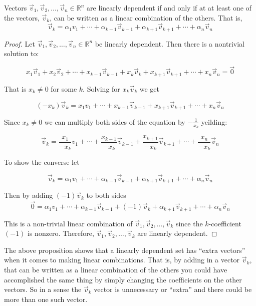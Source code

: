 \begin{proposition} Vectors $\vec{v}_1, \vec{v}_2, \ldots, \vec{v}_n \in \mathbb{R}^n$ are linearly dependent if and only if at at least one of the vectors, $\vec{v}_k$, can be written as a linear combination of the others. That is,
$$
\vec{v}_k=\alpha_1 v_1+ \cdots+ \alpha_{k-1}\vec{v}_{k-1}+ \alpha_{k+1}\vec{v}_{k+1}+\cdots+ \alpha_n \vec{v}_n
$$
\end{proposition}
\begin{proof}
Let $\vec{v}_1, \vec{v}_2, \ldots, \vec{v}_n \in \mathbb{R}^n$ be linearly dependent. Then there is a nontrivial solution to:

$$x_1\vec{v}_1+x_2\vec{v}_2+\cdots +x_{k-1}\vec{v}_{k-1}+ x_k\vec{v}_k+x_{k+1}\vec{v}_{k+1}+ \cdots + x_n \vec{v}_n=\vec{0}$$

That is $x_k \neq 0$ for some $k$. Solving for $x_k\vec{v}_k$ we get

$$
(-x_k)\vec{v}_k=x_1 v_1+ \cdots + x_{k-1}\vec{v}_{k-1}+ x_{k+1}\vec{v}_{k+1}+\cdots+ x_n \vec{v}_n
$$

Since $x_k \neq 0$ we can multiply both sides of the equation by $-\frac{1}{x_k}$ yeilding:

$$
\vec{v}_k=\frac{x_1}{-x_k} v_1+ \cdots + \frac{x_{k-1}}{-x_k}\vec{v}_{k-1}+ \frac{x_{k+1}}{-x_k}\vec{v}_{k+1}+\cdots+ \frac{x_n}{-x_k} \vec{v}_n
$$

To show the converse let 

$$\vec{v}_k=\alpha_1 v_1+ \cdots+ \alpha_{k-1}\vec{v}_{k-1}+ \alpha_{k+1}\vec{v}_{k+1}+\cdots+ \alpha_n \vec{v}_n$$

Then by adding $(-1)\vec{v}_k$ to both sides
$$
\vec{0}=\alpha_1 v_1+ \cdots+ \alpha_{k-1}\vec{v}_{k-1}+(-1)\vec{v}_k+ \alpha_{k+1}\vec{v}_{k+1}+\cdots+ \alpha_n \vec{v}_n
$$

This is a non-trivial linear combination of $\vec{v}_1, \vec{v}_2, \ldots, \vec{v}_k$ since the $k$-coefficient $(-1)$ is nonzero. Therefore, $\vec{v}_1, \vec{v}_2, \ldots, \vec{v}_k$ are linearly dependent.
\end{proof}

\begin{remark}
The above proposition shows that a linearly dependent set has ``extra vectors'' when it comes to making linear combinations. That is, by adding in a vector $\vec{v}_k$, that can be written as a linear combination of the others you could have accomplished the same thing by simply changing the coefficients on the other vectors. So in a sense the $\vec{v}_k$ vector is unnecessary or ``extra'' and there could be more than one such vector.
\end{remark}

